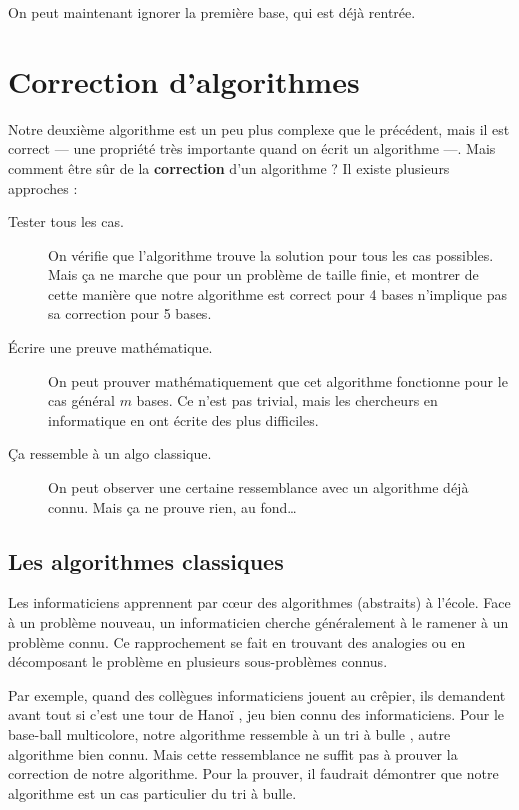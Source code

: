 \documentclass[a5paper,pagesize,DIV=14]{scrbook}
\begin{document}
On peut maintenant ignorer la première base, qui est déjà rentrée.

\section*{Correction d'algorithmes}

Notre deuxième algorithme est un peu plus complexe que le précédent, mais il
est correct --- une propriété très importante quand on écrit un algorithme ---. Mais comment être sûr de la \textbf{correction} d'un algorithme ? Il existe plusieurs approches :

\begin{description}
  \item[Tester tous les cas.] On vérifie que l'algorithme trouve la solution pour tous les cas possibles. Mais ça ne marche que pour un problème de taille finie, et montrer de cette manière que notre algorithme est correct pour 4 bases n'implique pas sa correction pour 5 bases.
  \item[Écrire une preuve mathématique.] On peut prouver mathématiquement que cet algorithme fonctionne pour le cas général $m$ bases. Ce n'est pas trivial, mais les chercheurs en informatique en ont écrite des plus difficiles.
  \item[Ça ressemble à un algo classique.] On peut observer une certaine
    ressemblance avec un algorithme déjà connu. Mais ça ne prouve rien, au
    fond{\ldots}
\end{description}

\subsection*{Les algorithmes classiques}

Les informaticiens apprennent par c\oe{}ur des algorithmes (abstraits) à l'école. Face à un problème nouveau, un informaticien cherche généralement à le ramener à un problème connu. Ce rapprochement se fait en trouvant des analogies ou en décomposant le problème en plusieurs sous-problèmes connus.

Par exemple, quand des collègues informaticiens jouent au crêpier, ils demandent avant tout si c'est \og une tour de Hanoï \fg, jeu bien connu des informaticiens. Pour le base-ball multicolore, notre algorithme ressemble à un \og tri à bulle \fg, autre algorithme bien connu. Mais cette ressemblance ne suffit pas à prouver la correction de notre algorithme. Pour la prouver, il faudrait démontrer que notre algorithme est un cas particulier du tri à bulle.
 
\end{document}
